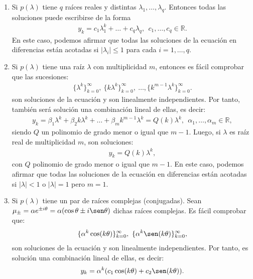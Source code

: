 \begin{enumerate}
    \item Si $p(\lambda)$ tiene $q$ raíces reales y distintas $\lambda_1,\ldots,\lambda_q$. Entonces todas las soluciones puede escribirse de la forma
    \begin{align*}
        y_k = c_1\lambda_1^k + \ldots + c_q \lambda_q, \ \ c_1,\ldots,c_q \in \mathbb{R}.
    \end{align*}
    En este caso, podemos afirmar que todas las soluciones de la ecuación en diferencias están acotadas si $|\lambda_i| \leq 1$ para cada $i = 1,\ldots,q$.
    \item Si $p(\lambda)$ tiene una raíz $\lambda$ con multiplicidad $m$, entonces es fácil comprobar que las sucesiones:
    \begin{align*}
        \{\lambda^k\}_{k=0}^{\infty}, \ \{k\lambda^k\}_{k=0}^{\infty},\ \ldots,\{k^{m-1}\lambda^k\}_{k=0}^{\infty}.
    \end{align*}
    son soluciones de la ecuación y son linealmente independientes. Por tanto, también será solución una combinación lineal de ellas, es decir: \begin{align*}
        y_k = \beta_1 \lambda^k + \beta_2 k \lambda^k + \ldots +\beta_m k^{m-1}\lambda^k = Q(k)\lambda^k, \ \ \alpha_1,\ldots,\alpha_m \in \mathbb{R},
    \end{align*}
    siendo $Q$ un polinomio de grado menor o igual que $m-1$. Luego, si $\lambda$ es raíz real de multiplicidad $m$, son soluciones:
    \begin{align*}
    y_k = Q(k)\lambda^k,
    \end{align*}
    con $Q$ polinomio de grado menor o igual que $m-1$. En este caso, podemos afirmar que todas las soluciones de la ecuación en diferencias están acotadas si $|\lambda| < 1$ o $|\lambda| = 1$ pero $m=1$. 
    \item Si $p(\lambda)$ tiene un par de raíces complejas (conjugadas). Sean $\mu_{\pm} = \alpha e^{\pm i \theta} = \alpha(\cos \theta \pm i\sen\theta)$ dichas raíces complejas. Es fácil comprobar que:
    \begin{align*}
        \{\alpha^k \cos(k\theta) \}_{k=0}^{\infty}, \ \{\alpha^k \sen(k\theta) \}_{k=0}^{\infty},
    \end{align*}
    son soluciones de la ecuación y son linealmente independientes. Por tanto, es solución una combinación lineal de ellas, es decir:
    \begin{align*}
        y_k = \alpha^k(c_1 \cos(k\theta) + c_2 \sen(k\theta)).

\end{align*}
\end{enumerate}
